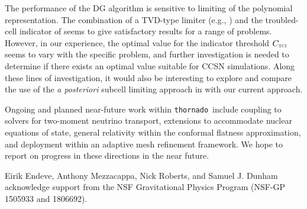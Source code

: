 \documentclass[letterpaper]{jpconf}
\newcommand{\TCI}{\textnormal{\tiny\textsc{TCI}}}
\newcommand{\thornado}{\texttt{thornado}}
\begin{document}
The performance of the DG algorithm is sensitive to limiting of the polynomial representation.  
The combination of a TVD-type limiter (e.g., \cite{cockburnShu_1998}) and the troubled-cell indicator of \cite{fuShu_2017} seems to give satisfactory results for a range of problems.  
However, in our experience, the optimal value for the indicator threshold $C_{\TCI}$ seems to vary with the specific problem, and further investigation is needed to determine if there exists an optimal value suitable for CCSN simulations.  
Along these lines of investigation, it would also be interesting to explore and compare the use of the {\it a posteriori} subcell limiting approach in \cite{dumbser_etal_2014,fambri_etal_2018} with our current approach.  

Ongoing and planned near-future work within \thornado\ include coupling to solvers for two-moment neutrino transport, extensions to accommodate nuclear equations of state, general relativity within the conformal flatness approximation, and deployment within an adaptive mesh refinement framework.  
We hope to report on progress in these directions in the near future.  

\ack Eirik Endeve, Anthony Mezzacappa, Nick Roberts, and Samuel J. Dunham acknowledge support from the NSF Gravitational Physics Program (NSF-GP 1505933 and 1806692).
\end{document}
